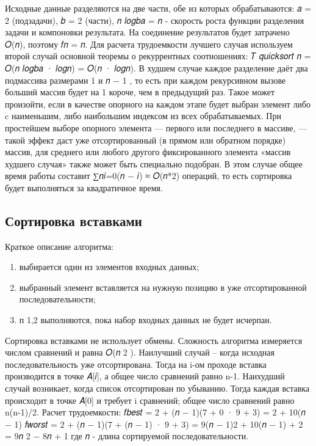 Исходные данные разделяются на две части, обе из которых обрабатываются: 𝑎 = 2 (подзадачи), 𝑏 = 2
(части), 𝑛
𝑙𝑜𝑔𝑏𝑎 = 𝑛 - скорость роста функции разделения задачи и компоновки результата. На соединение
результатов будет затрачено 𝑂(𝑛), поэтому 𝑓𝑛 = 𝑛.
Для расчета трудоемкости лучшего случая используем второй случай основной теоремы о рекуррентных соотношениях: 𝑇
𝑞𝑢𝑖𝑐𝑘𝑠𝑜𝑟𝑡
𝑛 = 𝑂(𝑛
𝑙𝑜𝑔𝑏𝑎
· 𝑙𝑜𝑔𝑛) = 𝑂(𝑛 · 𝑙𝑜𝑔𝑛).
В худшем случае каждое разделение даёт два подмассива размерами 1 и 𝑛 − 1 , то есть при каждом
рекурсивном вызове больший массив будет на 1 короче, чем в предыдущий раз. Такое может произойти,
если в качестве опорного на каждом этапе будет выбран элемент либо c наименьшим, либо наибольшим
индексом из всех обрабатываемых. При простейшем выборе опорного элемента — первого или последнего
в массиве, — такой эффект даст уже отсортированный (в прямом или обратном порядке) массив, для
среднего или любого другого фиксированного элемента «массив худшего случая» также может быть
специально подобран. В этом случае общее время работы составит ∑︁𝑛𝑖=0(𝑛 − 𝑖) ≈ 𝑂(𝑛*2)
операций, то есть сортировка будет выполняться за квадратичное время.

\subsection{Сортировка вставками}
Краткое описание алгоритма:
\begin{enumerate}
	\item выбирается один из элементов входных данных;
	\item выбранный элемент вставляется на нужную позицию в уже отсортированной последовательности;
	\item п 1,2 выполняются, пока набор входных данных не будет исчерпан.
\end{enumerate}
Сортировка вставками не использует обмены. Сложность алгоритма измеряется числом сравнений
и равна 𝑂(𝑛
2
). Наилучший случай – когда исходная последовательность уже отсортирована. Тогда на
i-ом проходе вставка производится в точке 𝐴[𝑖], а общее число сравнений равно n-1. Наихудший случай
возникает, когда список отсортирован по убыванию. Тогда каждая вставка происходит в точке 𝐴[0] и
требует i сравнений; общее число сравнений равно n(n-1)/2.
Расчет трудоемкости:
𝑓𝑏𝑒𝑠𝑡 = 2 + (𝑛 − 1)(7 + 0 · 9 + 3) = 2 + 10(𝑛 − 1)
𝑓𝑤𝑜𝑟𝑠𝑡 = 2 + (𝑛 − 1)(7 + (𝑛 − 1) · 9 + 3) = 9(𝑛 − 1)2 + 10(𝑛 − 1) + 2 = 9𝑛
2 − 8𝑛 + 1
где 𝑛 - длина сортируемой последовательности.

